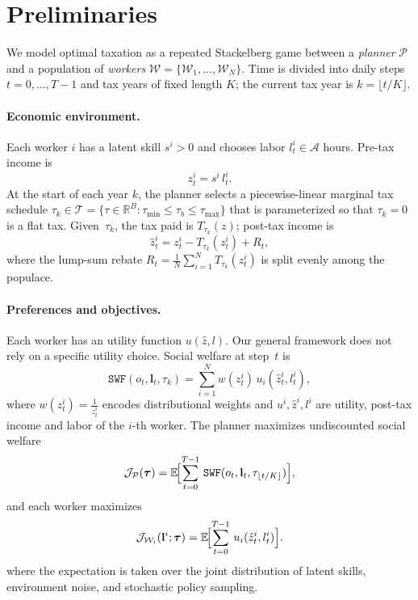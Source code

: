 \section{Preliminaries}
\label{sec:preliminaries}
We model optimal taxation as a repeated Stackelberg game between a \textit{planner} $\mathcal{P}$ and a population of \textit{workers} $\mathcal{W}=\{\mathcal{W}_{1},\dots,\mathcal{W}_{N}\}$.  
Time is divided into daily steps $t=0,\dots,T-1$ and tax years of fixed length $K$; the current tax year is $k=\lfloor t/K\rfloor$.

\paragraph{Economic environment.}
Each worker $i$ has a latent skill $s^{i}>0$ and chooses labor $l_{t}^{i}\in\mathcal{A}$ hours.
Pre-tax income is  
\[
z_{t}^{i}=s^{i}\,l_{t}^{i}.
\]
At the start of each year $k$, the planner selects a piecewise-linear marginal tax schedule $\tau_{k}\in\mathcal{T}=\{\tau\in\mathbb{R}^{B}:\tau_{\min}\le\tau_b\le\tau_{\max}\}$ that is parameterized so that $\tau_{k}=0$ is a flat tax.  
Given~$\tau_{k}$, the tax paid is $T_{\tau_{k}}(z)$; post-tax income is  
\[
\hat z_{t}^{i}=z_{t}^{i}-T_{\tau_{k}}(z_{t}^{i})+R_{t},
\]
where the lump-sum rebate $R_t = \frac{1}{N}\sum_{i=1}^N T_{\tau_k}(z_t^i)$ is split evenly among the populace.

\paragraph{Preferences and objectives.}
Each worker has an utility function $u(\hat{z}, l)$. Our general framework does not rely on a specific utility choice. 
Social welfare at step~$t$ is  
\[
\texttt{SWF}(o_{t},\mathbf{l}_{t},\tau_{k})
=\sum_{i=1}^{N}w(z_{t}^{i})\,u_{i}(\hat z_{t}^{i},l_{t}^{i}),
\]
where $w(z_{t}^{i}) = \frac{1}{z_{t}^{i}}$ encodes distributional weights and $u^i, \hat{z}^i, l^i$ are utility, post-tax income and labor of the $i$-th worker.  
The planner maximizes undiscounted social welfare
\begin{equation}
\mathcal{J}_{\mathcal{P}}(\boldsymbol{\tau})
=\mathbb{E}\!\Bigl[\sum_{t=0}^{T-1}\,
      \texttt{SWF}(o_{t},\mathbf{l}_{t},\tau_{\lfloor t/K\rfloor})\Bigr],
\label{eq:planner}
\end{equation}
and each worker maximizes
\begin{equation}
\mathcal{J}_{\mathcal{W}_{i}}(\mathbf{l}^{i};\boldsymbol{\tau})
=\mathbb{E}\!\Bigl[\sum_{t=0}^{T-1}\,
      u_{i}(\hat z_{t}^{i},l_{t}^{i})\Bigr].
\label{eq:worker}
\end{equation}
where the expectation is taken over the joint distribution of
latent skills, environment noise, and stochastic policy sampling.

